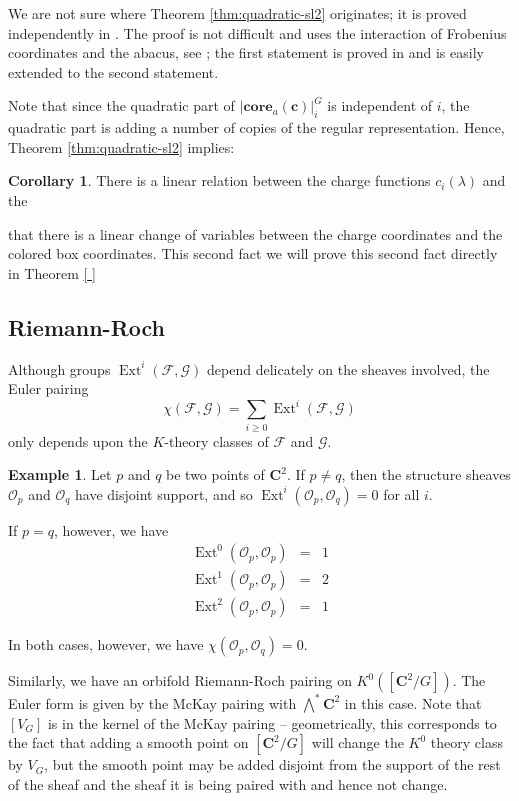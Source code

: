 \documentclass{amsart}[12pt]
\theoremstyle{definition}
\newtheorem{example}[dummy]{Example}
\newtheorem{corollary}[dummy]{Corollary}
\newcommand{\C}{\mathbf{C}}
\newcommand{\core}{\mathbf{core}}
\DeclareMathOperator{\Ext}{Ext}
\begin{document}
We are not sure where Theorem \ref{thm:quadratic-sl2} originates; it is proved independently in \cite{GKS, DS}.  The proof is not difficult and uses the interaction of Frobenius coordinates and the abacus, see ; the first statement is proved in \cite{johnson} and is easily extended to the second statement. 


Note that since the quadratic part of $|\core_a(\mathbf{c})|^G_i$ is independent of $i$, the quadratic part is adding a number of copies of the regular representation.  Hence, Theorem \ref{thm:quadratic-sl2} implies:

\begin{corollary} 
There is a linear relation between the charge functions $c_i(\lambda)$ and the 
\end{corollary}

 that there is a linear change of variables between the charge coordinates and the colored box coordinates.  This second fact we will prove this second fact directly in Theorem \ref{ }


\subsection{Riemann-Roch}

Although groups $\Ext^i(\mathcal{F},\mathcal{G})$ depend delicately on the sheaves involved, the Euler pairing
$$\chi(\mathcal{F},\mathcal{G})=\sum_{i\geq 0} \Ext^i(\mathcal{F},\mathcal{G})$$
only depends upon the $K$-theory classes of $\mathcal{F}$ and $\mathcal{G}$.

\begin{example}
Let $p$ and $q$ be two points of $\C^2$.  If $p\neq q$, then the structure sheaves $\mathcal{O}_p$ and $\mathcal{O}_q$ have disjoint support, and so $\Ext^i(\mathcal{O}_p,\mathcal{O}_q)=0$ for all $i$.

If $p=q$, however, we have 
\begin{eqnarray*}
\Ext^0(\mathcal{O}_p,\mathcal{O}_p)&=&1\\
\Ext^1(\mathcal{O}_p,\mathcal{O}_p)&=&2\\
\Ext^2(\mathcal{O}_p,\mathcal{O}_p)&=&1 
\end{eqnarray*}

In both cases, however, we have $\chi(\mathcal{O}_p,\mathcal{O}_q)=0$.
\end{example}

Similarly, we have an orbifold Riemann-Roch pairing on $K^0([\C^2/G])$.  The Euler form is given by the McKay pairing with $\bigwedge^* \C^2$ in this case.  Note that $[V_G]$ is in the kernel of the McKay pairing -- geometrically, this corresponds to the fact that adding a smooth point on $[\C^2/G]$ will change the $K^0$ theory class by $V_G$, but the smooth point may be added disjoint from the support of the rest of the sheaf and the sheaf it is being paired with and hence not change.
\end{document}
